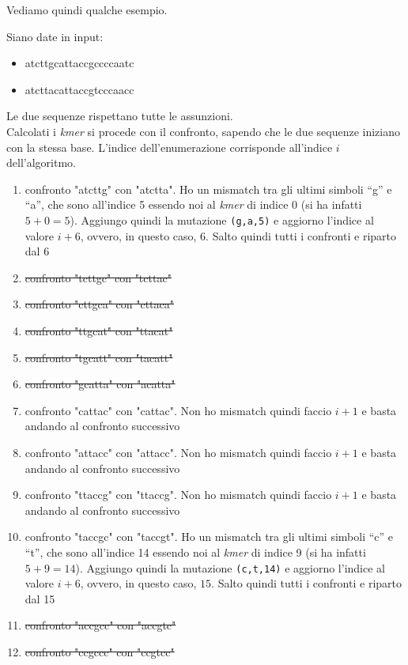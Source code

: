 \documentclass[a4paper,12pt, oneside]{book}
\begin{document}
Vediamo quindi qualche esempio.
\begin{esempio}
  \label{es:21}
  Siano date in input:
  \begin{itemize}
    \item atcttgcattaccgccccaatc
    \item atcttacattaccgtcccaacc
  \end{itemize}
  Le due sequenze rispettano tutte le assunzioni.\\
  Calcolati i \textit{kmer} si procede con il confronto, sapendo che le due
  sequenze iniziano con la stessa base. L'indice dell'enumerazione corrisponde
  all'indice $i$ dell'algoritmo.
  \begin{enumerate}[start=0]
    \item confronto "atcttg" con "atctta". Ho un mismatch tra gli ultimi simboli
    ``g'' e ``a'', che sono all'indice 5 essendo noi al \textit{kmer} di indice
    0 (si ha infatti $5+0=5$). Aggiungo quindi la mutazione \texttt{(g,a,5)}
    e aggiorno l'indice al valore $i+6$, ovvero, in questo caso, $6$. Salto
    quindi tutti i confronti e riparto dal 6
    \item \sout{confronto "tcttgc" con "tcttac"}
    \item \sout{confronto "cttgca" con "cttaca"}
    \item \sout{confronto "ttgcat" con "ttacat"}
    \item \sout{confronto "tgcatt" con "tacatt"}
    \item \sout{confronto "gcatta" con "acatta"}
    \item confronto "cattac" con "cattac". Non ho mismatch quindi faccio $i+1$ e
    basta andando al confronto successivo
    \item confronto "attacc" con "attacc". Non ho mismatch quindi faccio $i+1$ e
    basta andando al confronto successivo
    \item confronto "ttaccg" con "ttaccg". Non ho mismatch quindi faccio $i+1$ e
    basta andando al confronto successivo
    \item confronto "taccgc" con "taccgt". Ho un mismatch tra gli ultimi simboli
    ``c'' e ``t'', che sono all'indice 14 essendo noi al \textit{kmer} di indice
    9 (si ha infatti $5+9=14$). Aggiungo quindi la mutazione
    \texttt{(c,t,14)} 
    e aggiorno l'indice al valore $i+6$, ovvero, in questo caso, $15$. Salto
    quindi tutti i confronti e riparto dal 15
    \item \sout{confronto "accgcc" con "accgtc"}
    \item \sout{confronto "ccgccc" con "ccgtcc"}

\end{enumerate}
\end{esempio}
\end{document}
